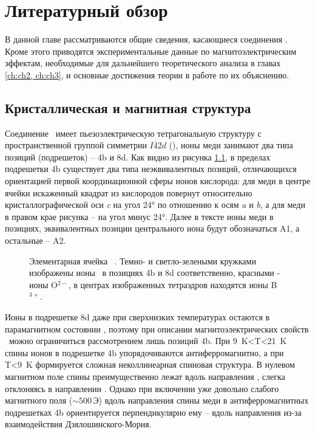 \chapter{Литературный обзор}\label{ch:ch1}

В данной главе рассматриваются общие сведения, касающиеся соединения \cbo. Кроме этого приводятся экспериментальные данные по магнитоэлектрическим эффектам, необходимые для дальнейшего теоретического анализа в главах \cref{ch:ch2, ch:ch3}, и основные достижения теории в работе по их объяснению.

\section{Кристаллическая и магнитная структура \cbo}\label{sec:ch1/sec1}

Соединение \cbo\ имеет пьезоэлектрическую тетрагональную структуру с пространственной группой симметрии \(I\overline{4}2d\) (), ионы меди занимают два типа позиций (подрешеток) – 4b и 8d. Как видно из рисунка \cref{fig:unit-cell}, в пределах подрешетки 4b существует два типа неэквивалентных позиций, отличающихся ориентацией первой координационной сферы ионов кислорода: для меди в центре ячейки искаженный квадрат из кислородов повернут относительно кристаллографической оси \emph{c} на угол \ang{24} по отношению к осям \emph{a} и \emph{b}, а для меди в правом крае рисунка -- на угол минус \ang{24}. Далее в тексте ионы меди в позициях, эквивалентных позиции центрального иона будут обозначаться A1, а остальные -- A2.

\begin{figure}[ht]
	\caption{Элементарная ячейка \cbo\ \cite{Martinez1971}. Темно- и светло-зелеными кружками изображены ионы \cu\ в позициях 4b и 8d соответственно, красными - ионы O\(^{2-}\), в центрах изображенных тетраэдров находятся ионы B\(^{3+}\). }
	\label{fig:unit-cell}
\end{figure}

Ионы в подрешетке 8d даже при сверхнизких температурах остаются в парамагнитном состоянии \cite{Boehm2003}, поэтому при описании магнитоэлектрических свойств \cbo\ можно ограничиться рассмотрением лишь позиций 4b. При \SI{9}{\kelvin}<T<\SI{21}{\kelvin} спины ионов в подрешетке 4b  упорядочиваются антиферромагнитно, а при T<\SI{9}{\kelvin} формируется сложная неколлинеарная спиновая структура.  В нулевом магнитном поле спины преимущественно лежат вдоль направления , слегка отклоняясь в направлении  \cite{Boehm2003}. Однако при включении уже довольно слабого магнитного поля (\({\sim}500\,\)Э) вдоль направления  спины меди в антиферромагнитных подрешетках 4b ориентируется перпендикулярно ему – вдоль направления  \cite{Toyoda2019} из-за взаимодействия Дзялошинского-Мория.


